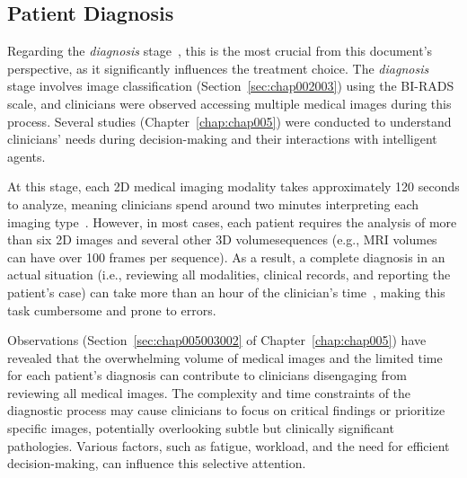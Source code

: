 \subsection{Patient Diagnosis}
\label{sec:app001005002}

Regarding the {\it diagnosis} stage~\cite{https://doi.org/10.1002/cncr.32872}, this is the most crucial from this document's perspective, as it significantly influences the treatment choice.
The {\it diagnosis} stage involves image classification (Section~\ref{sec:chap002003}) using the \ac{BI-RADS} scale, and clinicians were observed accessing multiple medical images during this process.
Several studies (Chapter~\ref{chap:chap005}) were conducted to understand clinicians' needs during decision-making and their interactions with intelligent agents.

At this stage, each 2D medical imaging modality takes approximately 120 seconds to analyze, meaning clinicians spend around two minutes interpreting each imaging type~\cite{jiang2018interpretation}.
However, in most cases, each patient requires the analysis of more than six 2D images and several other 3D volume\footnotemark[16] sequences (e.g., MRI volumes can have over 100 frames per sequence).
As a result, a complete diagnosis in an actual situation (i.e., reviewing all modalities, clinical records, and reporting the patient's case) can take more than an hour of the clinician's time~\cite{Forsberg2017}, making this task cumbersome and prone to errors.


Observations (Section~\ref{sec:chap005003002} of Chapter~\ref{chap:chap005}) have revealed that the overwhelming volume of medical images and the limited time for each patient's diagnosis can contribute to clinicians disengaging from reviewing all medical images.
The complexity and time constraints of the diagnostic process may cause clinicians to focus on critical findings or prioritize specific images, potentially overlooking subtle but clinically significant pathologies.
Various factors, such as fatigue, workload, and the need for efficient decision-making, can influence this selective attention.

